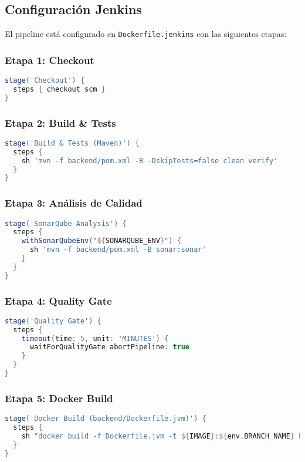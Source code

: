 \documentclass[12pt,a4paper]{article}
\begin{document}
\subsection{Configuración Jenkins}

El pipeline está configurado en \texttt{Dockerfile.jenkins} con las siguientes etapas:

\subsubsection{Etapa 1: Checkout}
\begin{lstlisting}[language=groovy]
stage('Checkout') {
  steps { checkout scm }
}
\end{lstlisting}

\subsubsection{Etapa 2: Build \& Tests}
\begin{lstlisting}[language=groovy]
stage('Build & Tests (Maven)') {
  steps {
    sh 'mvn -f backend/pom.xml -B -DskipTests=false clean verify'
  }
}
\end{lstlisting}

\subsubsection{Etapa 3: Análisis de Calidad}
\begin{lstlisting}[language=groovy]
stage('SonarQube Analysis') {
  steps {
    withSonarQubeEnv("${SONARQUBE_ENV}") {
      sh 'mvn -f backend/pom.xml -B sonar:sonar'
    }
  }
}
\end{lstlisting}

\subsubsection{Etapa 4: Quality Gate}
\begin{lstlisting}[language=groovy]
stage('Quality Gate') {
  steps {
    timeout(time: 5, unit: 'MINUTES') {
      waitForQualityGate abortPipeline: true
    }
  }
}
\end{lstlisting}

\subsubsection{Etapa 5: Docker Build}
\begin{lstlisting}[language=groovy]
stage('Docker Build (backend/Dockerfile.jvm)') {
  steps {
    sh "docker build -f Dockerfile.jvm -t ${IMAGE}:${env.BRANCH_NAME} backend"
  }
}
\end{lstlisting}
\end{document}
